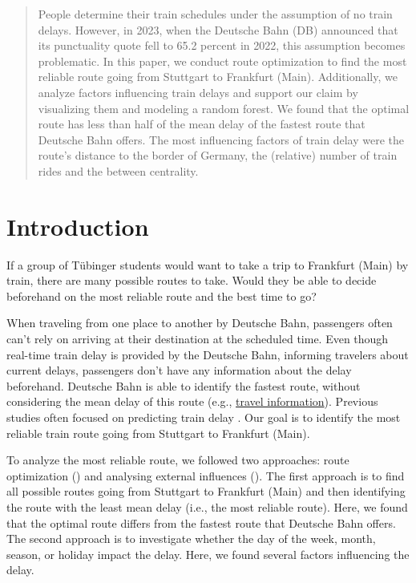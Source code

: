 \documentclass{article}
\theoremstyle{plain}
\theoremstyle{definition}
\theoremstyle{remark}
\begin{document}
\printAffiliationsAndNotice{\icmlEqualContribution} %

\begin{abstract}
People determine their train schedules under the assumption of no train delays. However, in 2023, when the Deutsche Bahn (DB) announced that its punctuality quote fell to 65.2 percent in 2022, this assumption becomes problematic. In this paper, we conduct route optimization to find the most reliable route going from Stuttgart to Frankfurt (Main). Additionally, we analyze factors influencing train delays and support our claim by visualizing them and modeling a random forest. We found that the optimal route has less than half of the mean delay of the fastest route that Deutsche Bahn offers. The most influencing factors of train delay were the route's distance to the border of Germany, the (relative) number of train rides and the between centrality.

\end{abstract}

\section{Introduction}\label{sec:intro}
If a group of Tübinger students would want to take a trip to Frankfurt (Main) by train, there are many possible routes to take. Would they be able to decide beforehand on the most reliable route and the best time to go?

When traveling from one place to another by Deutsche Bahn, passengers often can't rely on arriving at their destination at the scheduled time. Even though real-time train delay is provided by the Deutsche Bahn, informing travelers about current delays, passengers don't have any information about the delay beforehand. Deutsche Bahn is able to identify the fastest route, without considering the mean delay of this route (e.g., \href{https://www.bahn.de/buchung/intern/start}{travel information}). Previous studies often focused on predicting train delay \cite{predtraindelay, largetrainnet, MLtraindel}. Our goal is to identify the most reliable train route going from Stuttgart to Frankfurt (Main).

To analyze the most reliable route, we followed two approaches: route optimization () and analysing external influences (). The first approach is to find all possible routes going from Stuttgart to Frankfurt (Main) and then identifying the route with the least mean delay (i.e., the most reliable route). Here, we found that the optimal route differs from the fastest route that Deutsche Bahn offers. The second approach is to investigate whether the day of the week, month, season, or holiday impact the delay. Here, we found several factors influencing the delay.
\end{document}
